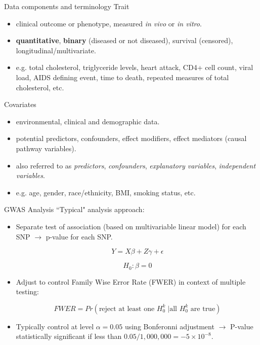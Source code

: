 \begin{frame}{Data components and terminology}
Trait
\begin{itemize}
\item clinical outcome or phenotype, measured \emph{in vivo} or \emph{in vitro}.
\item {\bf quantitative}, {\bf binary} (diseased or not diseased), survival (censored), longitudinal/multivariate.
\item e.g. total cholesterol, triglyceride levels, heart attack, CD4+ cell count, viral load, AIDS defining event, time to death, repeated measures of total cholesterol, etc.
\end{itemize}
Covariates
\begin{itemize}
\item environmental, clinical and demographic data.
\item potential predictors, confounders, effect modifiers, effect mediators (causal pathway variables).
\item also referred to as \emph{predictors}, \emph{confounders}, \emph{explanatory variables}, \emph{independent variables}.
\item e.g. age, gender, race/ethnicity, BMI, smoking status, etc.
\end{itemize}
\end{frame}


\begin{frame}{GWAS Analysis}
``Typical" analysis approach:
\begin{itemize}
\item Separate test of association (based on multivariable linear model) for each SNP $\rightarrow$ p-value for each SNP.

\begin{equation*}
Y=X\beta + Z \gamma + \epsilon
\end{equation*}

\begin{equation*}
H_0: \beta=0
\end{equation*}

\item Adjust to control Family Wise Error Rate (FWER) in context of multiple testing: 

\begin{equation*}
FWER=Pr(\text{reject at least one }H_0^k \; | \text{all } H_0^k \text{ are true})
\end{equation*}

\item Typically control at level $\alpha=0.05$ using Bonferonni adjustment $\rightarrow$ P-value statistically significant if less than $0.05/1,000,000=-5 \times 10^{-8}$.
\end{itemize}
\end{frame}


